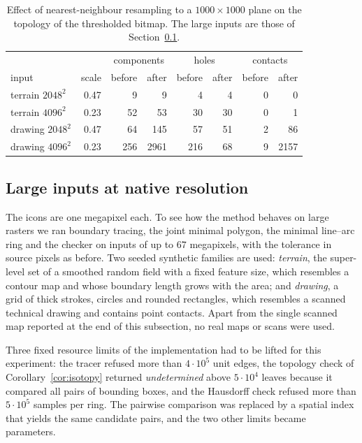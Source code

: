 \documentclass[11pt,a4paper]{article}
\theoremstyle{definition}
\theoremstyle{remark}
\begin{document}
\begin{table}[h]
\centering
\caption{Effect of nearest-neighbour resampling to a $1000\times1000$ plane
on the topology of the thresholded bitmap. The large inputs are those of
Section~\ref{sec:scale}.}
\label{tab:resampling}
\begin{tabular}{lrrrrrrr}
\toprule
 & & \multicolumn{2}{c}{components} & \multicolumn{2}{c}{holes} & \multicolumn{2}{c}{contacts}\\
input & scale & before & after & before & after & before & after\\
\midrule
terrain $2048^2$ & 0.47 & 9 & 9 & 4 & 4 & 0 & 0\\
terrain $4096^2$ & 0.23 & 52 & 53 & 30 & 30 & 0 & 1\\
drawing $2048^2$ & 0.47 & 64 & 145 & 57 & 51 & 2 & 86\\
drawing $4096^2$ & 0.23 & 256 & 2961 & 216 & 68 & 9 & 2157\\
\bottomrule
\end{tabular}
\end{table}

\subsection{Large inputs at native resolution}\label{sec:scale}

The icons are one megapixel each. To see how the method behaves on large
rasters we ran boundary tracing, the joint minimal polygon, the minimal
line--arc ring and the checker on inputs of up to $67$ megapixels, with the
tolerance in source pixels as before. Two seeded
synthetic families are used:
\emph{terrain}, the super-level set of a smoothed random field with a fixed
feature size, which resembles a contour map and whose boundary length grows
with the area; and \emph{drawing}, a grid of thick strokes, circles and
rounded rectangles, which resembles a scanned technical drawing and contains
point contacts. Apart from the single scanned map reported at the end of this
subsection, no real maps or scans were used.

Three fixed resource limits of the implementation had to be lifted for this
experiment: the tracer refused more than $4\cdot10^{5}$ unit edges, the
topology check of Corollary~\ref{cor:isotopy} returned \emph{undetermined}
above $5\cdot10^{4}$ leaves because it compared all pairs of bounding boxes,
and the Hausdorff check refused more than $5\cdot10^{5}$ samples per ring.
The pairwise comparison was replaced by a spatial index that yields the same
candidate pairs, and the two other limits became parameters.
\end{document}
